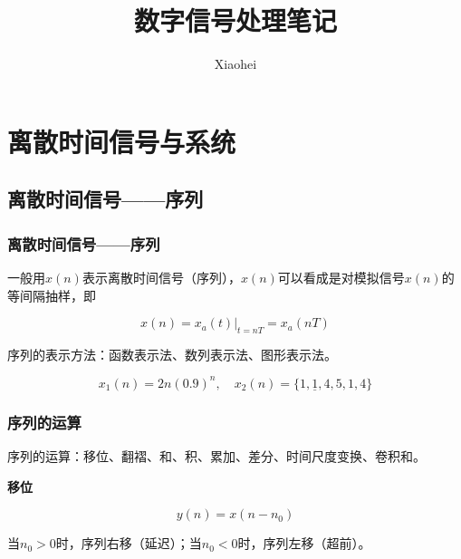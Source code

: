 \documentclass[cn, hazy, blue, normal, 12pt]{elegantnote}
\title{数字信号处理笔记}
\author{Xiaohei}
\institute{Created by Elegant\LaTeX{}}
\date{\zhtoday}
\begin{document}
\maketitle

\section{离散时间信号与系统}

\subsection{离散时间信号——序列}

\subsubsection{离散时间信号——序列}

一般用$x(n)$表示离散时间信号（序列），$x(n)$可以看成是对模拟信号$x(n)$的等间隔抽样，即

\begin{equation}
        x(n)=\left.x_a(t)\right|_{t=nT}=x_a(nT)
\end{equation}

序列的表示方法：函数表示法、数列表示法、图形表示法。

$$x_1(n)=2n(0.9)^n, \quad x_2(n)=\{1, \underline{1}, 4, 5, 1, 4\}$$

\begin{center}
\end{center}

\subsubsection{序列的运算}

序列的运算：移位、翻褶、和、积、累加、差分、时间尺度变换、卷积和。

\textbf{移位}

\begin{equation}
        y(n)=x(n-n_0)
\end{equation}

当$n_0>0$时，序列右移（延迟）；当$n_0<0$时，序列左移（超前）。
\end{document}
